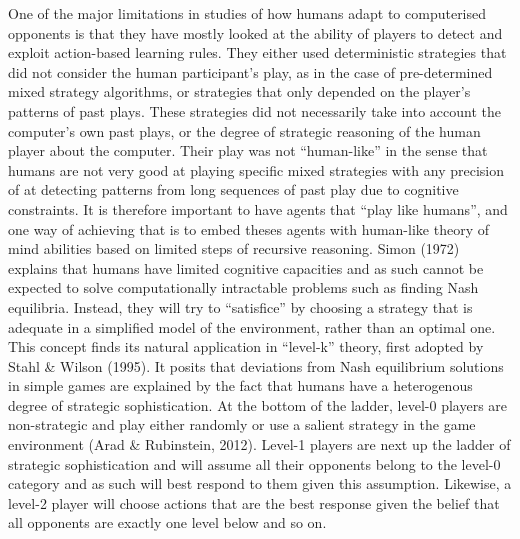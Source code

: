 \documentclass[,man,floatsintext]{apa6}
\begin{document}
One of the major limitations in studies of how humans adapt to computerised opponents is that they have mostly looked at the ability of players to detect and exploit action-based learning rules. They either used deterministic strategies that did not consider the human participant's play, as in the case of pre-determined mixed strategy algorithms, or strategies that only depended on the player's patterns of past plays. These strategies did not necessarily take into account the computer's own past plays, or the degree of strategic reasoning of the human player about the computer. Their play was not \enquote{human-like} in the sense that humans are not very good at playing specific mixed strategies with any precision of at detecting patterns from long sequences of past play due to cognitive constraints. It is therefore important to have agents that \enquote{play like humans}, and one way of achieving that is to embed theses agents with human-like theory of mind abilities based on limited steps of recursive reasoning. Simon (1972) explains that humans have limited cognitive capacities and as such cannot be expected to solve computationally intractable problems such as finding Nash equilibria. Instead, they will try to \enquote{satisfice} by choosing a strategy that is adequate in a simplified model of the environment, rather than an optimal one. This concept finds its natural application in \enquote{level-k} theory, first adopted by Stahl \& Wilson (1995). It posits that deviations from Nash equilibrium solutions in simple games are explained by the fact that humans have a heterogenous degree of strategic sophistication. At the bottom of the ladder, level-0 players are non-strategic and play either randomly or use a salient strategy in the game environment (Arad \& Rubinstein, 2012). Level-1 players are next up the ladder of strategic sophistication and will assume all their opponents belong to the level-0 category and as such will best respond to them given this assumption. Likewise, a level-2 player will choose actions that are the best response given the belief that all opponents are exactly one level below and so on.
\end{document}
